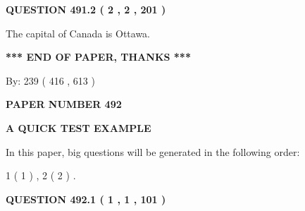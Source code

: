\documentclass[12pt]{article}
\begin{document}
 
  
\vspace{0.2in}
  
{\textbf{\Large{QUESTION
491.2 
 ( 2 , 2 , 201 )
}}}
  
  
 
 
\noindent{}
 
 
The capital of Canada is Ottawa.
 
 
 
 
   
   
 \vspace{0.2in}
 
   
   
   
   
\vspace{1.0in} 
{\textbf{\large{ *** END OF PAPER, THANKS *** }}} 
   
   
\hspace{1.0in} By: 
 239 ( 416 ,  613 )
   
   
   
   
\newpage 
\setcounter{page}{ 
   492001 } 
   
   
   
   
 {\textbf{ \Large{ PAPER NUMBER  492  }}}
   
   
\vspace{0.2in}
   
   
   
   
   
   
 \vspace{0.2in}
{\LARGE {\textbf{ A QUICK TEST EXAMPLE}}}
   
   
   
\vspace{0.2in}
   
In this paper, big questions will be generated in the following order: 
   
   
   1 ( 1 )
 ,
   2 ( 2 )
 .
  
\vspace{0.2in}
  
{\textbf{\Large{QUESTION
492.1 
 ( 1 , 1 , 101 )
}}}
  
  
 
 
\noindent{}
\end{document}
